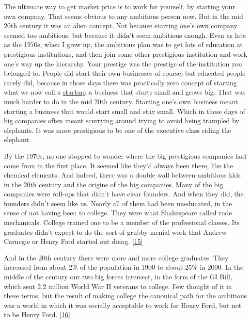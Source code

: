 The ultimate way to get market price is to work for yourself, by
starting your own company.  That seems obvious to any ambitious
person now.  But in the mid 20th century it was an alien concept.
Not because starting one's own company seemed too ambitious, but
because it didn't seem ambitious enough. Even as late as the 1970s,
when I grew up, the ambitious plan was to get lots of education at
prestigious institutions, and then join some other prestigious
institution and work one's way up the hierarchy.  Your prestige was
the prestige of the institution you belonged to.  People did start
their own businesses of course, but educated people rarely did,
because in those days there was practically zero concept of starting
what we now call a \href{http://www.paulgraham.com/growth.html}{\underline{startup}}: 
a business that starts small and grows
big.  That was much harder to do in the mid 20th century.  Starting
one's own business meant starting a business that would start small
and stay small. Which in those days of big companies often meant
scurrying around trying to avoid being trampled by elephants.  It
was more prestigious to be one of the executive class riding the
elephant.

By the 1970s, no one stopped to wonder where the big prestigious
companies had come from in the first place.  It seemed like they'd
always been there, like the chemical elements.  And indeed, there
was a double wall between ambitious kids in the 20th century and
the origins of the big companies.  Many of the big companies were
roll-ups that didn't have clear founders.  And when they did, the
founders didn't seem like us.  Nearly all of them had been uneducated,
in the sense of not having been to college.  They were what Shakespeare
called rude mechanicals.  College trained one to be a member of the
professional classes.  Its graduates didn't expect to do the sort
of grubby menial work that Andrew Carnegie or Henry Ford started
out doing. 
[\href{\#f15n}{15}]

And in the 20th century there were more and more college graduates.
They increased from about 2\% of the population in 1900 to about 25\%
in 2000. In the middle of the century our two big forces intersect,
in the form of the GI Bill, which sent 2.2 million World War II
veterans to college.  Few thought of it in these terms, but the
result of making college the canonical path for the ambitious was
a world in which it was socially acceptable to work for Henry Ford,
but not to be Henry Ford.
[\href{\#f16n}{16}]


